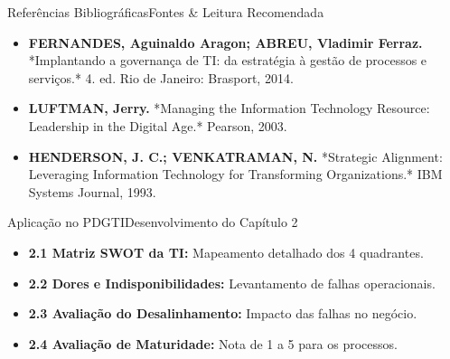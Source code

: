 \begin{senaiframe}{Referências Bibliográficas}{Fontes \& Leitura Recomendada}
  \vspace{0.5cm}
  \begin{tcolorbox}[senaicard, title={Obras de Referência}]
    \begin{itemize}
      \item \textbf{FERNANDES, Aguinaldo Aragon; ABREU, Vladimir Ferraz.} *Implantando a governança de TI: da estratégia à gestão de processos e serviços.* 4. ed. Rio de Janeiro: Brasport, 2014.
      \item \textbf{LUFTMAN, Jerry.} *Managing the Information Technology Resource: Leadership in the Digital Age.* Pearson, 2003.
      \item \textbf{HENDERSON, J. C.; VENKATRAMAN, N.} *Strategic Alignment: Leveraging Information Technology for Transforming Organizations.* IBM Systems Journal, 1993.
    \end{itemize}
  \end{tcolorbox}
\end{senaiframe}

\begin{senaiframe}{Aplicação no PDGTI}{Desenvolvimento do Capítulo 2}
  \vspace{0.5cm}
  \begin{tcolorbox}[senaigreencard, title={Capítulo 2 – Diagnóstico da Situação Atual}]
    \begin{itemize}
      \item \textbf{2.1 Matriz SWOT da TI:} Mapeamento detalhado dos 4 quadrantes.
      \item \textbf{2.2 Dores e Indisponibilidades:} Levantamento de falhas operacionais.
      \item \textbf{2.3 Avaliação do Desalinhamento:} Impacto das falhas no negócio.
      \item \textbf{2.4 Avaliação de Maturidade:} Nota de 1 a 5 para os processos.
    \end{itemize}
  \end{tcolorbox}
\end{senaiframe}
